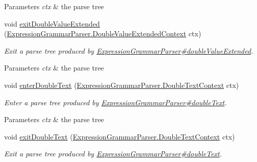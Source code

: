 \begin{DoxyCompactItemize}
\begin{DoxyCompactList}
\begin{DoxyParams}{Parameters}
{\em ctx} & the parse tree\\
\hline
\end{DoxyParams}
 \end{DoxyCompactList}\item 
void \hyperlink{classgov_1_1nasa_1_1jpf_1_1inspector_1_1server_1_1expression_1_1parser_1_1_expression_grammar_base_listener_adc134f3adc22b99ab1f5754f4b9df022}{exit\+Double\+Value\+Extended} (\hyperlink{classgov_1_1nasa_1_1jpf_1_1inspector_1_1server_1_1expression_1_1parser_1_1_expression_grammar_paf529e59fbe08e921d008fd67634bb19c}{Expression\+Grammar\+Parser.\+Double\+Value\+Extended\+Context} ctx)
\begin{DoxyCompactList}\small\item\em Exit a parse tree produced by \hyperlink{classgov_1_1nasa_1_1jpf_1_1inspector_1_1server_1_1expression_1_1parser_1_1_expression_grammar_parser_ae0693f1cb83f2bfc63b96a0f9debe43f}{Expression\+Grammar\+Parser\#double\+Value\+Extended}.


\begin{DoxyParams}{Parameters}
{\em ctx} & the parse tree\\
\hline
\end{DoxyParams}
 \end{DoxyCompactList}\item 
void \hyperlink{classgov_1_1nasa_1_1jpf_1_1inspector_1_1server_1_1expression_1_1parser_1_1_expression_grammar_base_listener_aafa00e8db3607e0d921dba7ca2b6c346}{enter\+Double\+Text} (\hyperlink{classgov_1_1nasa_1_1jpf_1_1inspector_1_1server_1_1expression_1_1parser_1_1_expression_grammar_parser_1_1_double_text_context}{Expression\+Grammar\+Parser.\+Double\+Text\+Context} ctx)
\begin{DoxyCompactList}\small\item\em Enter a parse tree produced by \hyperlink{classgov_1_1nasa_1_1jpf_1_1inspector_1_1server_1_1expression_1_1parser_1_1_expression_grammar_parser_a3795d0b45018e075565149ff89fe27f6}{Expression\+Grammar\+Parser\#double\+Text}.


\begin{DoxyParams}{Parameters}
{\em ctx} & the parse tree\\
\hline
\end{DoxyParams}
 \end{DoxyCompactList}\item 
void \hyperlink{classgov_1_1nasa_1_1jpf_1_1inspector_1_1server_1_1expression_1_1parser_1_1_expression_grammar_base_listener_a7e28b40db48f1ead0a98d4313518fd8e}{exit\+Double\+Text} (\hyperlink{classgov_1_1nasa_1_1jpf_1_1inspector_1_1server_1_1expression_1_1parser_1_1_expression_grammar_parser_1_1_double_text_context}{Expression\+Grammar\+Parser.\+Double\+Text\+Context} ctx)
\begin{DoxyCompactList}\small\item\em Exit a parse tree produced by \hyperlink{classgov_1_1nasa_1_1jpf_1_1inspector_1_1server_1_1expression_1_1parser_1_1_expression_grammar_parser_a3795d0b45018e075565149ff89fe27f6}{Expression\+Grammar\+Parser\#double\+Text}.



\end{DoxyCompactList}
\end{DoxyCompactItemize}
